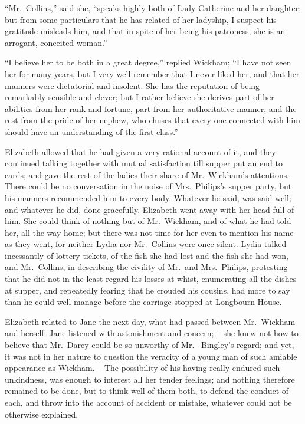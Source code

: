 “Mr.\ Collins,” said she, “speaks highly both of Lady
Catherine and her daughter; but from some particulars
that he has related of her ladyship, I suspect his gratitude
misleads him, and that in spite of her being his patroness,
she is an arrogant, conceited woman.”

“I believe her to be both in a great degree,” replied
Wickham; “I have not seen her for many years, but
I very well remember that I never liked her, and that
her manners were dictatorial and insolent. She has the
reputation of being remarkably sensible and clever; but
I rather believe she derives part of her abilities from her
rank and fortune, part from her authoritative manner,
and the rest from the pride of her nephew, who chuses
that every one connected with him should have an understanding
of the first class.”

Elizabeth allowed that he had given a very rational
account of it, and they continued talking together with
mutual satisfaction till supper put an end to cards; and
gave the rest of the ladies their share of Mr.\ Wickham’s
attentions. There could be no conversation in the noise
of Mrs.\ Philips’s supper party, but his manners recommended
him to every body. Whatever he said, was said
well; and whatever he did, done gracefully. Elizabeth
went away with her head full of him. She could think of
nothing but of Mr.\ Wickham, and of what he had told her,
all the way home; but there was not time for her even
to mention his name as they went, for neither Lydia nor
Mr.\ Collins were once silent. Lydia talked incessantly of
lottery tickets, of the fish she had lost and the fish she had
won, and Mr.\ Collins, in describing the civility of Mr.\ and
Mrs.\ Philips, protesting that he did not in the least regard
his losses at whist, enumerating all the dishes at supper,
and repeatedly fearing that he crouded his cousins, had
more to say than he could well manage before the carriage
stopped at Longbourn House.


Elizabeth related to Jane the next day, what had
passed between Mr.\ Wickham and herself. Jane listened
with astonishment and concern; -- she knew not how to
believe that Mr.\ Darcy could be so unworthy of Mr.\ %
Bingley’s regard; and yet, it was not in her nature to
question the veracity of a young man of such amiable
appearance as Wickham. -- The possibility of his having
really endured such unkindness, was enough to interest
all her tender feelings; and nothing therefore remained
to be done, but to think well of them both, to defend the
conduct of each, and throw into the account of accident
or mistake, whatever could not be otherwise explained.

